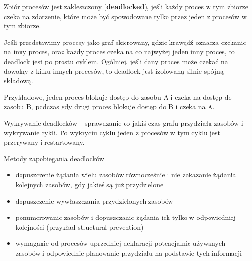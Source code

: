 Zbiór procesów jest zakleszczony (\textbf{deadlocked}), jeśli każdy proces w tym zbiorze czeka na zdarzenie, które może być spowodowane tylko przez jeden z procesów w tym zbiorze.

Jeśli przedstawimy procesy jako graf skierowany, gdzie krawędź oznacza czekanie na inny proces, oraz każdy proces czeka na co najwyżej jeden inny proces, to deadlock jest po prostu cyklem. Ogólniej, jeśli dany proces może czekać na dowolny z kilku innych procesów, to deadlock jest izolowaną silnie spójną składową.

Przykładowo, jeden proces blokuje dostęp do zasobu A i czeka na dostęp do zasobu B, podczas gdy drugi proces blokuje dostęp do B i czeka na A.

Wykrywanie deadlocków -- sprawdzanie co jakiś czas grafu przydziału zasobów i wykrywanie cykli. Po wykryciu cyklu jeden z procesów w tym cyklu jest przerywany i restartowany.

Metody zapobiegania deadlocków:
\begin{itemize}
    \item dopuszczenie żądania wielu zasobów równocześnie i nie zakazanie żądania kolejnych zasobów, gdy jakieś są już przydzielone
    \item dopuszczenie wywłaszczania przydzielonych zasobów
    \item ponumerowanie zasobów i dopuszczanie żądania ich tylko w odpowiedniej kolejności (przykład structural prevention)
    \item wymaganie od procesów uprzedniej deklaracji potencjalnie używanych zasobów i odpowiednie planowanie przydziału na podstawie tych informacji
\end{itemize}